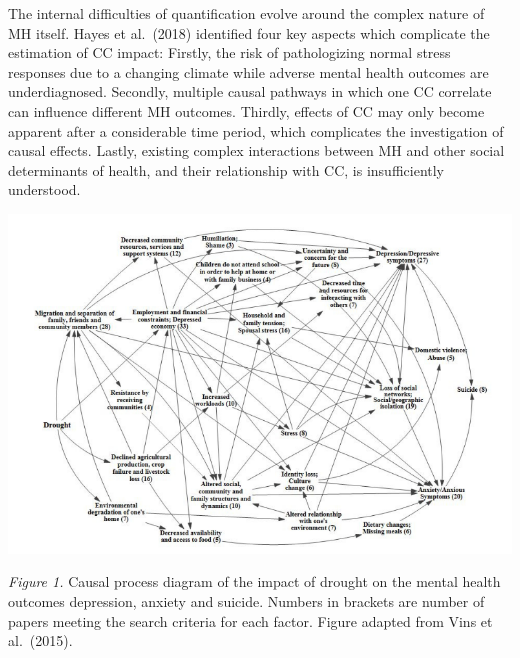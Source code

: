 \documentclass[
]{krantz}
\begin{document}
The internal difficulties of quantification evolve around the complex nature of MH itself. Hayes et al.~(2018) identified four key aspects which complicate the estimation of CC impact: Firstly, the risk of pathologizing normal stress responses due to a changing climate while adverse mental health outcomes are underdiagnosed. Secondly, multiple causal pathways in which one CC correlate can influence different MH outcomes. Thirdly, effects of CC may only become apparent after a considerable time period, which complicates the investigation of causal effects. Lastly, existing complex interactions between MH and other social determinants of health, and their relationship with CC, is insufficiently understood.

\begin{center}\includegraphics[width=0.8\linewidth]{work/12-mentalhealth/figures/drought_impact} \end{center}

\emph{Figure 1.} Causal process diagram of the impact of drought on the mental health outcomes depression, anxiety and suicide. Numbers in brackets are number of papers meeting the search criteria for each factor. Figure adapted from Vins et al.~(2015).
\end{document}
